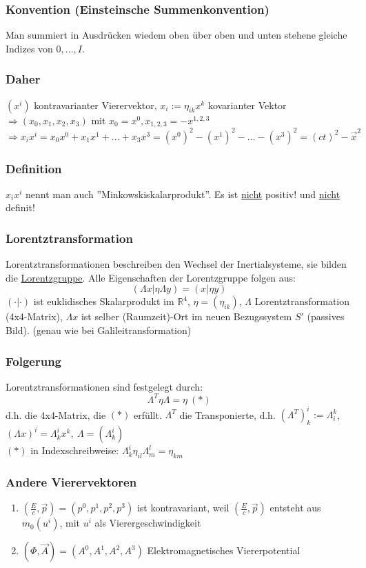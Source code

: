 \documentclass[twoside,a4paper]{scrartcl}
\newcommand{\R}{\mathbb{R}}
\renewcommand{\1}{\mathds{1}}
\newcommand{\Ra}{\Rightarrow}
\renewcommand{\L}{\Lambda}
\renewcommand{\R}{\mathbb{R}}
\begin{document}
\subsubsection*{Konvention (Einsteinsche Summenkonvention)}
Man summiert in Ausdrücken wiedem oben über oben und unten stehene gleiche Indizes von $0,...,I$.
\subsubsection*{Daher}
$(x^i)$ kontravarianter Vierervektor, $x_i:= \eta_{ik}x^k$ kovarianter Vektor\\
$\Ra (x_0,x_1,x_2,x_3)$ mit $x_0=x^0, x_{1,2,3}=-x^{1,2,3}$\\
$\Ra x_ix^i=x_0x^0+x_1x^1+...+x_3x^3=(x^0)^2-(x^1)^2-...-(x^3)^2=(ct)^2-\vec x^2$
\subsubsection*{Definition}
 $x_ix^i$ nennt man auch ''Minkowskiskalarprodukt''. Es ist \underline{nicht} positiv! und \underline{nicht} definit!
\subsubsection*{Lorentztransformation}
Lorentztransformationen beschreiben den Wechsel der Inertialsysteme, sie bilden die \underline{Lorentzgruppe}. Alle Eigenschaften der Lorentzgruppe folgen aus:
$$(\L x|\eta\L y)=(x|\eta y)$$
$(\cdot|\cdot)$ ist euklidisches Skalarprodukt im $\R^4$, $\eta=(\eta_{ik})$, $\L$ Lorentztransformation (4x4-Matrix), $\L x$ ist selber (Raumzeit)-Ort im neuen Bezugssystem $S'$ (passives Bild). (genau wie bei Galileitransformation)
\subsubsection*{Folgerung}
Lorentztransformationen sind festgelegt durch:
$$\L ^T \eta \L = \eta \ (*)$$
d.h. die 4x4-Matrix, die $(*)$ erfüllt. $\L^T$ die Transponierte, d.h. $(\L^T)_k^i:=\L_i^k$, $(\L x)^i=\L_k^i x^k, \ \L=(\L_k^i)$\\
$(*)$ in Indexschreibweise: $\L_k^i \eta_{il} \L_m^l=\eta_{km}$
\subsubsection*{Andere Vierervektoren}
\begin{enumerate}
\item $(\frac{E}{c},\vec p)=(p^0,p^1,p^2,p^3)$ ist kontravariant, weil $(\frac{E}{c},\vec p)$ entsteht aus $m_0(u^i)$, mit $u^i$ als Vierergeschwindigkeit
\item $(\Phi,\vec A)=(A^0,A^1,A^2,A^3)$ Elektromagnetisches Viererpotential
\end{enumerate}
\end{document}

